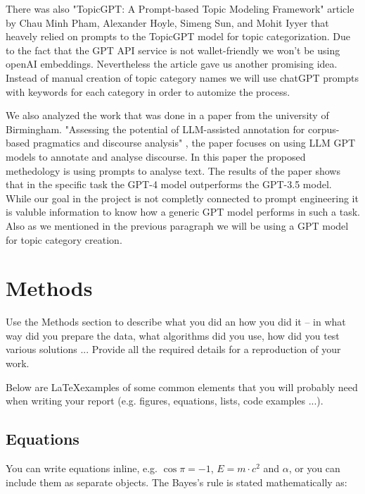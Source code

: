 \documentclass[fleqn,moreauthors,10pt]{ds_report}
\begin{document}
    There was also "TopicGPT: A Prompt-based Topic Modeling Framework" article by Chau Minh Pham, Alexander Hoyle, Simeng Sun, and Mohit Iyyer \cite{pham2023topicgpt} that heavely relied on prompts to the TopicGPT model for topic categorization. Due to the fact that the GPT API service is not wallet-friendly we won't be using openAI embeddings. Nevertheless the article gave us another promising idea. Instead of manual creation of topic category names we will use chatGPT prompts with keywords for each category in order to automize the process. 

    We also analyzed the work that was done in a paper from the university of Birmingham. "Assessing the potential of LLM-assisted annotation for corpus-based pragmatics and discourse analysis" \cite{llm2023analysis}, the paper focuses on using LLM GPT models to annotate and analyse discourse. In this paper the proposed methedology is using prompts to analyse text. The results of the paper shows that in the specific task the GPT-4 model outperforms the GPT-3.5 model. While our goal in the project is not completly connected to prompt engineering it is valuble information to know how a generic GPT model performs in such a task. Also as we mentioned in the previous paragraph we will be using a GPT model for topic category creation.



\section*{Methods}

Use the Methods section to describe what you did an how you did it -- in what way did you prepare the data, what algorithms did you use, how did you test various solutions ... Provide all the required details for a reproduction of your work.

Below are \LaTeX examples of some common elements that you will probably need when writing your report (e.g. figures, equations, lists, code examples ...).


\subsection*{Equations}

You can write equations inline, e.g. $\cos\pi=-1$, $E = m \cdot c^2$ and $\alpha$, or you can include them as separate objects. The Bayes’s rule is stated mathematically as:
\end{document}
